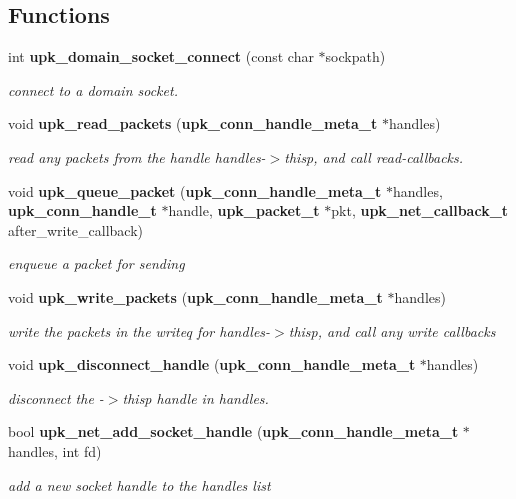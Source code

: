 \subsection*{Functions}
\begin{DoxyCompactItemize}
\item 
int {\bf upk\_\-domain\_\-socket\_\-connect} (const char $\ast$sockpath)
\begin{DoxyCompactList}\small\item\em connect to a domain socket. \end{DoxyCompactList}\item 
void {\bf upk\_\-read\_\-packets} ({\bf upk\_\-conn\_\-handle\_\-meta\_\-t} $\ast$handles)
\begin{DoxyCompactList}\small\item\em read any packets from the handle handles-\/$>$thisp, and call read-\/callbacks. \end{DoxyCompactList}\item 
void {\bf upk\_\-queue\_\-packet} ({\bf upk\_\-conn\_\-handle\_\-meta\_\-t} $\ast$handles, {\bf upk\_\-conn\_\-handle\_\-t} $\ast$handle, {\bf upk\_\-packet\_\-t} $\ast$pkt, {\bf upk\_\-net\_\-callback\_\-t} after\_\-write\_\-callback)
\begin{DoxyCompactList}\small\item\em enqueue a packet for sending \end{DoxyCompactList}\item 
void {\bf upk\_\-write\_\-packets} ({\bf upk\_\-conn\_\-handle\_\-meta\_\-t} $\ast$handles)
\begin{DoxyCompactList}\small\item\em write the packets in the writeq for handles-\/$>$thisp, and call any write callbacks \end{DoxyCompactList}\item 
void {\bf upk\_\-disconnect\_\-handle} ({\bf upk\_\-conn\_\-handle\_\-meta\_\-t} $\ast$handles)
\begin{DoxyCompactList}\small\item\em disconnect the -\/$>$thisp handle in handles. \end{DoxyCompactList}\item 
bool {\bf upk\_\-net\_\-add\_\-socket\_\-handle} ({\bf upk\_\-conn\_\-handle\_\-meta\_\-t} $\ast$handles, int fd)
\begin{DoxyCompactList}\small\item\em add a new socket handle to the handles list \end{DoxyCompactList}\item 

\end{DoxyCompactItemize}
